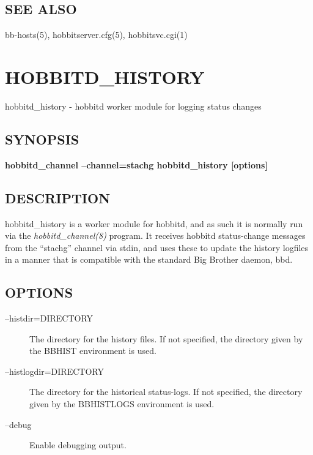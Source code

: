 \subsection{SEE ALSO}
bb-hosts(5), hobbitserver.cfg(5), hobbitsvc.cgi(1) 

 
  
%
\newpage
\section{HOBBITD\_HISTORY}

 hobbitd\_history - hobbitd worker module for logging status changes

 \subsection{SYNOPSIS}
\textbf{hobbitd\_channel --channel=stachg hobbitd\_history [options]}


 
\subsection{DESCRIPTION}
 hobbitd\_history is a worker module for hobbitd, and as such it is
 normally run via the \emph{hobbitd\_channel(8)} program. It receives
 hobbitd status-change messages from the ``stachg'' channel via stdin,
 and uses these to update the history logfiles in a manner that is
 compatible with the standard Big Brother daemon, bbd. 


 
\subsection{OPTIONS}
\begin{description}
\item[--histdir=DIRECTORY] The directory for the history files. If not
  specified, the directory given by the BBHIST environment is used. 


 

\item[--histlogdir=DIRECTORY] The directory for the historical status-logs. If not specified, the directory given by the BBHISTLOGS environment is used. 

 

\item[--debug] Enable debugging output. 

 


\end{description}
